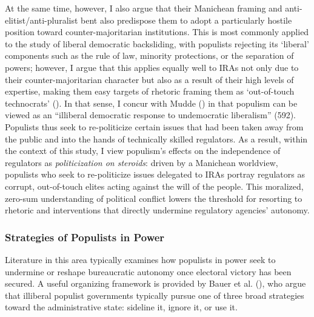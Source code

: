 \documentclass[
  11pt,
  letterpaper,
  DIV=11,
  numbers=noendperiod]{scrartcl}
\begin{document}
At the same time, however, I also argue that their Manichean framing and
anti-elitist/anti-pluralist bent also predispose them to adopt a
particularly hostile position toward counter-majoritarian institutions.
This is most commonly applied to the study of liberal democratic
backsliding, with populists rejecting its `liberal' components such as
the rule of law, minority protections, or the separation of powers;
however, I argue that this applies equally well to IRAs not only due to
their counter-majoritarian character but also as a result of their high
levels of expertise, making them easy targets of rhetoric framing them
as `out-of-touch technocrats' (). In
that sense, I concur with Mudde () in that
populism can be viewed as an ``illiberal democratic response to
undemocratic liberalism'' (592). Populists thus seek to re-politicize
certain issues that had been taken away from the public and into the
hands of technically skilled regulators. As a result, within the context
of this study, I view populism's effects on the independence of
regulators as \emph{politicization on steroids}: driven by a Manichean
worldview, populists who seek to re-politicize issues delegated to IRAs
portray regulators as corrupt, out-of-touch elites acting against the
will of the people. This moralized, zero-sum understanding of political
conflict lowers the threshold for resorting to rhetoric and
interventions that directly undermine regulatory agencies' autonomy.

\subsubsection{Strategies of Populists in
Power}\label{strategies-of-populists-in-power}

Literature in this area typically examines how populists in power seek
to undermine or reshape bureaucratic autonomy once electoral victory has
been secured. A useful organizing framework is provided by Bauer et al.
(), who argue that illiberal populist
governments typically pursue one of three broad strategies toward the
administrative state: sideline it, ignore it, or use it.
\end{document}
